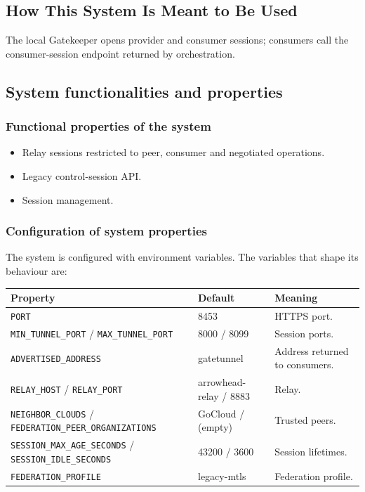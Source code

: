 \documentclass[a4paper]{arrowhead}
\begin{document}
\subsection{How This System Is Meant to Be Used}
\label{sec:use}

The local Gatekeeper opens provider and consumer sessions; consumers call the consumer-session endpoint returned by orchestration.

\subsection{System functionalities and properties}
\label{sec:properties}

\subsubsection{Functional properties of the system}

\begin{itemize}
  \item Relay sessions restricted to peer, consumer and negotiated operations.
  \item Legacy control-session API.
  \item Session management.
\end{itemize}

\subsubsection{Configuration of system properties}

The system is configured with environment variables. The variables that shape its behaviour are:

\noindent\begin{longtable}{| p{5.4cm} | p{3.4cm} | p{6.4cm} |} \hline
\rowcolor{gray!33} Property & Default & Meaning \\ \hline \endhead
\texttt{PORT} & 8453 & HTTPS port. \\ \hline
\texttt{MIN\_\allowbreak{}TUNNEL\_\allowbreak{}PORT} / \texttt{MAX\_\allowbreak{}TUNNEL\_\allowbreak{}PORT} & 8000 / 8099 & Session ports. \\ \hline
\texttt{ADVERTISED\_\allowbreak{}ADDRESS} & gatetunnel & Address returned to consumers. \\ \hline
\texttt{RELAY\_\allowbreak{}HOST} / \texttt{RELAY\_\allowbreak{}PORT} & arrowhead-relay / 8883 & Relay. \\ \hline
\texttt{NEIGHBOR\_\allowbreak{}CLOUDS} / \texttt{FEDERATION\_\allowbreak{}PEER\_\allowbreak{}ORGANIZATIONS} & GoCloud / (empty) & Trusted peers. \\ \hline
\texttt{SESSION\_\allowbreak{}MAX\_\allowbreak{}AGE\_\allowbreak{}SECONDS} / \texttt{SESSION\_\allowbreak{}IDLE\_\allowbreak{}SECONDS} & 43200 / 3600 & Session lifetimes. \\ \hline
\texttt{FEDERATION\_\allowbreak{}PROFILE} & legacy-mtls & Federation profile. \\ \hline
\end{longtable}
\end{document}
